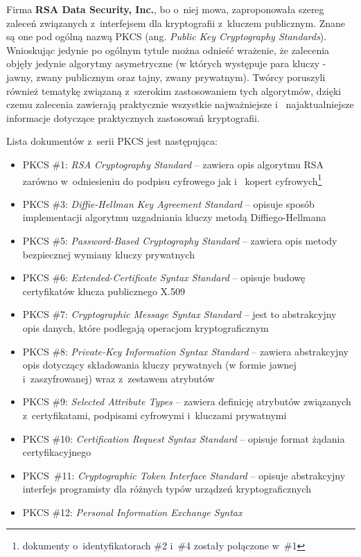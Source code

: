 Firma {\bf RSA Data Security, Inc.}, bo o~niej mowa, zaproponowała szereg zaleceń
związanych z~interfejsem dla kryptografii z~kluczem publicznym. Znane są one pod
ogólną nazwą PKCS (ang. {\em Public Key Cryptography Standards}).
Wnioskując jedynie po ogólnym tytule można odnieść wrażenie, że zalecenia
objęły jedynie algorytmy asymetryczne (w których występuje para kluczy -
jawny, zwany publicznym oraz tajny, zwany prywatnym). Twórcy poruszyli
również tematykę związaną z~szerokim zastosowaniem tych algorytmów, dzięki
czemu zalecenia zawierają praktycznie wszystkie najważniejsze i~
najaktualniejsze informacje dotyczące praktycznych zastosowań kryptografii.

Lista dokumentów z~serii PKCS jest następująca:
\begin{itemize}
    \item PKCS \#1: {\em RSA Cryptography Standard} -- zawiera opis
    algorytmu RSA zarówno w~odniesieniu do podpisu cyfrowego jak i~
    kopert cyfrowych\footnote{dokumenty o~identyfikatorach \#2 i~\#4
    zostały połączone w~\#1}
    \item PKCS \#3: {\em Diffie-Hellman Key Agreement Standard} -- opisuje
    sposób implementacji algorytmu uzgadniania kluczy metodą
    Diffiego-Hellmana
    \item PKCS \#5: {\em Password-Based Cryptography Standard} -- zawiera
    opis metody bezpiecznej wymiany kluczy prywatnych
    \item PKCS \#6: {\em Extended-Certificate Syntax Standard} --
    opisuje budowę certyfikatów klucza publicznego X.509
    \item PKCS \#7: {\em Cryptographic Message Syntax Standard} -- jest to
    abstrakcyjny opis danych, które podlegają operacjom kryptograficznym
    \item PKCS \#8: {\em Private-Key Information Syntax Standard} --
    zawiera abstrakcyjny opis dotyczący składowania kluczy prywatnych (w
    formie jawnej i~zaszyfrowanej) wraz z~zestawem atrybutów
    \item PKCS \#9: {\em Selected Attribute Types} -- zawiera definicję
    atrybutów związanych z~certyfikatami, podpisami cyfrowymi i~kluczami
    prywatnymi
    \item PKCS \#10: {\em Certification Request Syntax Standard} --
    opisuje format żądania certyfikacyjnego
    \item PKCS~\#11: {\em Cryptographic Token Interface Standard} --
    opisuje abstrakcyjny interfejs programisty dla różnych typów urządzeń
    kryptograficznych
    \item PKCS \#12: {\em Personal Information Exchange Syntax
}
\end{itemize}
